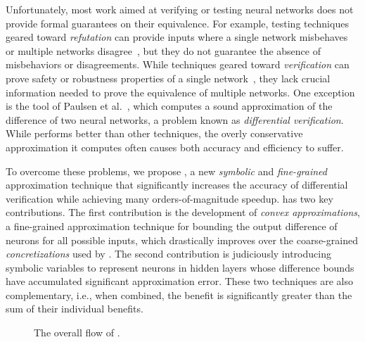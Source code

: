 Unfortunately, most work aimed at verifying or testing neural networks
does not provide formal guarantees on their equivalence.  For example,
testing techniques geared toward \emph{refutation} can provide inputs
where a single network misbehaves~\cite{ma2018deepgauge,
xie2019deephunter, SunWRHKK18, TianPJR18, odena2018tensorfuzz} or
multiple networks disagree~\cite{xie2019diffchaser,PeiCYJ17,MaLLZG18},
but they do not guarantee the absence of misbehaviors or disagreements.
%
While techniques geared toward \emph{verification} can prove safety or
robustness properties of a single
network~\cite{HuangKWW17,Ehlers17,KatzHIJLLSTWZDK19,RuanHK18,
WangPWYJ18nips,SinghGPV19iclr,MirmanGV18,GehrMDTCV18,FischerBDGZV19},
they lack crucial information needed to prove the equivalence of
multiple networks.
%
One exception is the \ReluDiff{} tool of Paulsen et
al.~\cite{PaulsenWW20}, which computes a sound approximation of the
difference of two neural networks, a problem known as
\textit{differential verification}.  While \ReluDiff{} performs
better than other techniques, the overly conservative approximation it
computes often causes both accuracy and efficiency to suffer.


To overcome these problems, we propose \Name{}, a new \emph{symbolic}
and \emph{fine-grained} approximation technique that significantly increases the
accuracy of differential verification while achieving many
orders-of-magnitude speedup.
%
\Name{} has two key contributions.  The first contribution is the development
of \emph{convex approximations}, a fine-grained approximation technique
for bounding the output difference of neurons for all possible inputs,
which drastically improves over the
coarse-grained \emph{concretizations} used by \ReluDiff{}.
%
The second contribution is judiciously introducing symbolic variables
to represent neurons in hidden layers whose difference bounds have
accumulated significant approximation error.
%
These two techniques are also complementary, i.e., when combined, the
benefit is significantly greater than the sum of their individual
benefits.



\begin{figure}[t]
	\centering
\scalebox{1.25}{}
\caption{The overall flow of \Name{}.}
\label{neurodiff:fig:diagram}
\end{figure}


